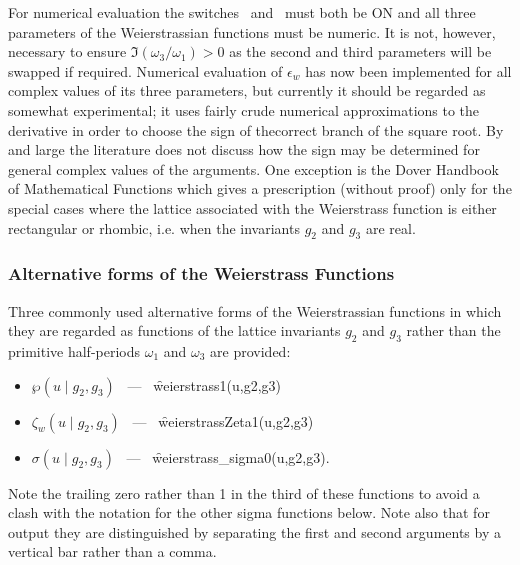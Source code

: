 For numerical evaluation the switches \ and \ must both
be ON and all three parameters of the Weierstrassian functions must be numeric.
It is not, however, necessary to ensure $\Im(\omega_3/\omega_1) >0$ as
the second and third parameters will be swapped if required.
Numerical evaluation of $\epsilon_{w}$ has now been implemented for all complex
values of its three parameters, but currently it should be regarded as somewhat
experimental; it uses fairly crude numerical approximations to the derivative
in order to choose the sign of thecorrect branch of the square root.  By and large
the literature does not discuss how the sign may be determined for general complex values
of the arguments. One exception is the Dover Handbook of Mathematical
Functions\cite{AbramowitzStegun:72} which gives a prescription (without proof)
only for the special cases where the lattice associated with the Weierstrass
function is either rectangular or rhombic, i.e. when the invariants $g_2$ and
$g_3$ are real.

\subsubsection{Alternative forms of the Weierstrass Functions}
\hypertarget{WEIERSTRASS1}{}
\hypertarget{WEIERSTRASSZETA1}{}
\hypertarget{WEIERSTRASS_SIGMA0}{}
\hypertarget{operator:WEIERSTRASS1}{}
\hypertarget{operator:WEIERSTRASSZETA1}{}
\hypertarget{operator:WEIERSTRASS_SIGMA0}{}
Three commonly used alternative forms of the Weierstrassian functions in which
they are regarded as functions of the lattice invariants $g_2$ and $g_3$
rather than the primitive half-periods $\omega_1$ and $\omega_3$ are provided:
\begin{itemize}
\item  $\wp(u \mid g_2, g_3)$ \ --- \ \f{weierstrass1(u,g2,g3)}
\item $\zeta_w(u \mid g_2, g_3)$ \ --- \ \f{weierstrassZeta1(u,g2,g3)}
\item $\sigma(u \mid g_2, g_3)$ \ --- \ \f{weierstrass\_sigma0(u,g2,g3)}.
\end{itemize}
Note the trailing zero rather than 1 in the third of these functions to avoid a
clash with the notation for the other sigma functions below.
Note also that for output they are distinguished by separating the first and
second arguments by a vertical bar rather than a comma.

